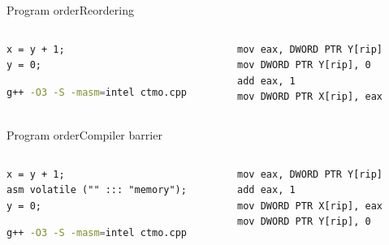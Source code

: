 \documentclass[aspectratio=169,compress]{beamer}
\begin{document}
\begin{frame}[fragile]{Program order}{Reordering}
	\begin{columns}[T]
			\begin{column}{0.5\textwidth}
\begin{lstlisting}[title={C++}]
x = y + 1;
y = 0;
\end{lstlisting}

\begin{lstlisting}[language=bash]
g++ -O3 -S -masm=intel ctmo.cpp
\end{lstlisting}

			\end{column}
			\begin{column}{0.4\textwidth}
\begin{lstlisting}[language={[x86masm]Assembler},title={ASM}]
mov eax, DWORD PTR Y[rip]
mov DWORD PTR Y[rip], 0 
add eax, 1
mov DWORD PTR X[rip], eax
\end{lstlisting}
			\end{column}
	\end{columns}

\end{frame}

\begin{frame}[fragile]{Program order}{Compiler barrier}
	\begin{columns}[T]
			\begin{column}{0.5\textwidth}
\begin{lstlisting}[title={C++}]
x = y + 1;
asm volatile ("" ::: "memory");
y = 0;
\end{lstlisting}

\begin{lstlisting}[language=bash]
g++ -O3 -S -masm=intel ctmo.cpp
\end{lstlisting}

			\end{column}
			\begin{column}{0.4\textwidth}
\begin{lstlisting}[language={[x86masm]Assembler},title={ASM}]
mov eax, DWORD PTR Y[rip]
add eax, 1
mov DWORD PTR X[rip], eax
mov DWORD PTR Y[rip], 0
\end{lstlisting}
			\end{column}
	\end{columns}

\end{frame}
\end{document}

